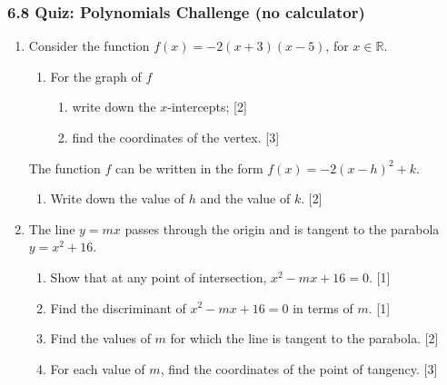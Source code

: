 \documentclass[12pt, twoside]{article}
\begin{document}
\subsubsection*{6.8 Quiz: Polynomials Challenge (no calculator)}

\begin{enumerate}[itemsep=0.15cm]

\item[1.] [Maximum mark: 7]

Consider the function $f(x) = -2(x + 3)(x - 5)$, for $x \in \mathbb{R}$.

\begin{enumerate}[itemsep=0.15cm]
  \item For the graph of $f$
  \begin{enumerate}[itemsep=0.1cm]
    \item[(i)] write down the $x$-intercepts; \hfill [2]
    \item[(ii)] find the coordinates of the vertex. \hfill [3]
  \end{enumerate}
\end{enumerate}

The function $f$ can be written in the form $f(x) = -2(x - h)^2 + k$.

\begin{enumerate}[itemsep=0.15cm]
  \item[(b)] Write down the value of $h$ and the value of $k$. \hfill [2]
\end{enumerate}


\newpage

\item[2.] [Maximum mark: 7]

The line $y = mx$ passes through the origin and is tangent
to the parabola $y = x^2 + 16$.

\begin{enumerate}[itemsep=0.15cm]
  \item Show that at any point of intersection,
  $x^2 - mx + 16 = 0$. \hfill [1]
  \item Find the discriminant of $x^2 - mx + 16 = 0$
  in terms of $m$. \hfill [1]
  \item Find the values of $m$ for which the line is tangent
  to the parabola. \hfill [2]
  \item For each value of $m$, find the coordinates of
  the point of tangency. \hfill [3]
\end{enumerate}


\end{enumerate}
\end{document}
